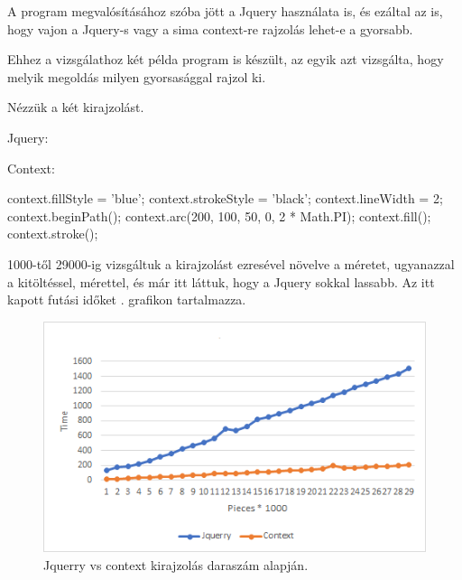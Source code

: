 



A program megvalósításához szóba jött a Jquery használata is, és ezáltal az is, hogy vajon a Jquery-s vagy a sima context-re rajzolás lehet-e a gyorsabb.


Ehhez a vizsgálathoz két példa program is készült, az egyik azt vizsgálta, hogy melyik megoldás milyen gyorsasággal rajzol ki.

Nézzük a két kirajzolást.

Jquery:

Context:

\begin{java}
	context.fillStyle = 'blue';
	context.strokeStyle = 'black';
	context.lineWidth = 2;
	context.beginPath();
	context.arc(200, 100, 50, 0, 2 * Math.PI);
	context.fill();
	context.stroke();
	
\end{java}


1000-től 29000-ig vizsgáltuk a kirajzolást ezresével növelve a méretet, ugyanazzal a kitöltéssel, mérettel, és már itt láttuk, hogy a Jquery sokkal lassabb. Az itt kapott futási időket . grafikon tartalmazza.

\begin{figure}[h]
	\centering
	\includegraphics[scale=1]{images/pieces.png}
	\caption{Jquerry vs context kirajzolás daraszám alapján.}
	\label{fig:pieces}
\end{figure}



